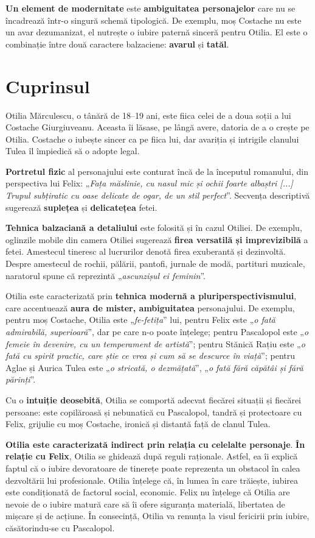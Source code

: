 \documentclass{article}
\newcommand{\qu}[1]{„\emph{#1}”}
\begin{document}
\textbf{Un element de modernitate} este \textbf{ambiguitatea personajelor} care nu se încadrează într-o singură schemă tipologică. De exemplu, moș Costache nu este un avar dezumanizat, el nutrește o iubire paternă sinceră pentru Otilia. El este o combinație între două caractere balzaciene: \textbf{avarul} și \textbf{tatăl}.
\section{Cuprinsul}
Otilia Mărculescu, o tânără de 18--19 ani, este fiica celei de a doua soții a lui Costache Giurgiuveanu. Aceasta îi lăsase, pe lângă avere, datoria de a o crește pe Otilia. Costache o iubește sincer ca pe fiica lui, dar avariția și intrigile clanului Tulea îl împiedică să o adopte legal.

\textbf{Portretul fizic} al personajului este conturat încă de la începutul romanului, din perspectiva lui Felix: \qu{Fața măslinie, cu nasul mic și ochii foarte albaștri [...] Trupul subțiratic cu oase delicate de ogar, de un stil perfect}. Secvența descriptivă sugerează \textbf{suplețea} și \textbf{delicatețea} fetei.

\textbf{Tehnica balzaciană a detaliului} este folosită și în cazul Otiliei. De exemplu, oglinzile mobile din camera Otiliei sugerează \textbf{firea versatilă și imprevizibilă} a fetei. Amestecul tineresc al lucrurilor denotă firea exuberantă și dezinvoltă. Despre amestecul de rochii, pălării, pantofi, jurnale de modă, partituri muzicale, naratorul spune că reprezintă \qu{ascunzișul ei feminin}.

Otilia este caracterizată prin \textbf{tehnica modernă a pluriperspectivismului}, care accentuează \textbf{aura de mister, ambiguitatea} personajului. De exemplu, pentru moș Costache, Otilia este \qu{fe-fetița} lui, pentru Felix este \qu{o fată admirabilă, superioară}, dar pe care n-o poate înțelege; pentru Pascalopol este \qu{o femeie în devenire, cu un temperament de artistă}; pentru Stănică Rațiu este \qu{o fată cu spirit practic, care știe ce vrea și cum să se descurce în viață}; pentru Aglae și Aurica Tulea este \qu{o stricată, o dezmățată}, \qu{o fată fără căpătâi și fără părinți}.

Cu o \textbf{intuiție deosebită}, Otilia se comportă adecvat fiecărei situații și fiecărei persoane: este copilăroasă și nebunatică cu Pascalopol, tandră și protectoare cu Felix, grijulie cu moș Costache, ironică și distantă față de clanul Tulea.

\textbf{Otilia este caracterizată indirect prin relația cu celelalte personaje}. \textbf{În relație cu Felix}, Otilia se ghidează după reguli raționale. Astfel, ea îi explică faptul că o iubire devoratoare de tinerețe poate reprezenta un obstacol în calea dezvoltării lui profesionale. Otilia înțelege că, în lumea în care trăiește, iubirea este condiționată de factorul social, economic. Felix nu înțelege că Otilia are nevoie de o iubire matură care să îi ofere siguranța materială, libertatea de mișcare și de acțiune. În consecință, Otilia va renunța la visul fericirii prin iubire, căsătorindu-se cu Pascalopol.
\end{document}
